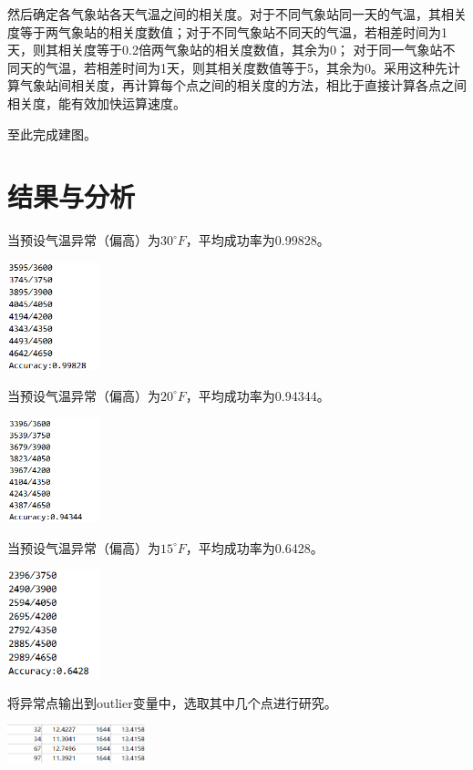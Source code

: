 \documentclass[a4paper]{ctexart}
\begin{document}
然后确定各气象站各天气温之间的相关度。对于不同气象站同一天的气温，其相关度等于两气象站的相关度数值；对于不同气象站不同天的气温，若相差时间为1天，则其相关度等于0.2倍两气象站的相关度数值，其余为0；
对于同一气象站不同天的气温，若相差时间为1天，则其相关度数值等于5，其余为0。采用这种先计算气象站间相关度，再计算每个点之间的相关度的方法，相比于直接计算各点之间相关度，能有效加快运算速度。

至此完成建图。

\section{结果与分析}
当预设气温异常（偏高）为$30^\circ F$，平均成功率为0.99828。

\includegraphics[width=0.2\textwidth]{accu_30.png}

当预设气温异常（偏高）为$20^\circ F$，平均成功率为0.94344。

\includegraphics[width=0.2\textwidth]{accu_20.png}

当预设气温异常（偏高）为$15^\circ F$，平均成功率为0.6428。

\includegraphics[width=0.2\textwidth]{accu_15.png}

将异常点输出到outlier变量中，选取其中几个点进行研究。

\includegraphics[width=0.3\textwidth]{outlier.png}
\end{document}
